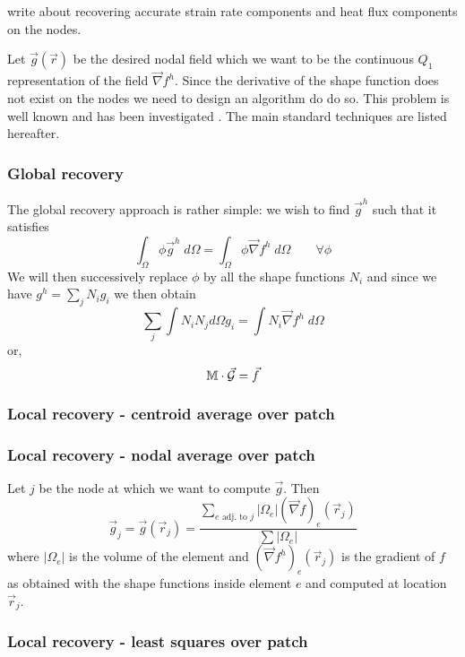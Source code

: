 
write about recovering accurate strain rate components and heat flux components on the nodes.

Let $\vec g(\vec r)$  be the desired nodal 
field which we want to be the continuous $Q_1$ representation of the field $\vec \nabla f^h$.
Since the derivative of the shape function does not exist on the nodes we need to design
an algorithm do do so. This problem is well known and has been 
investigated \cite{XX.XXX}.
The main standard techniques are listed hereafter.


\subsubsection{Global recovery}

The global recovery approach is rather simple: we wish to find $\vec g^h$
such that it satisfies
\[
\int_\Omega \phi \vec g^h \; d\Omega  = \int_\Omega \phi \vec\nabla f^h \; d\Omega 
\quad\quad \forall \phi
\] 
We will then successively replace $\phi$ by all the shape functions $N_i$ 
and since we have $g^h=\sum_j N_i g_i$ we then obtain
\[
\sum_j \int N_i N_j d\Omega g_i = \int N_i  \vec\nabla f^h \; d\Omega 
\]
or, 
\[
\mathbb{M} \cdot \vec{\cal G} = \vec f
\]



\subsubsection{Local recovery - centroid average over patch}





\subsubsection{Local recovery - nodal average over patch}

Let $j$ be the node at which we want to compute $\vec g$.
Then 
\[
\vec g_j = \vec g(\vec r_j) = 
\frac{\sum\limits_{ e \text{ adj. to }j} |\Omega_e| (\vec\nabla f)_e(\vec r_j) }{\sum |\Omega_e|}
\]
where $|\Omega_e|$ is the volume of the element and $(\vec\nabla f^h)_e(\vec r_j)$
is the gradient of $f$ as obtained with the shape functions inside element $e$ and 
computed at location $\vec r_j$.

\subsubsection{Local recovery - least squares over patch}



